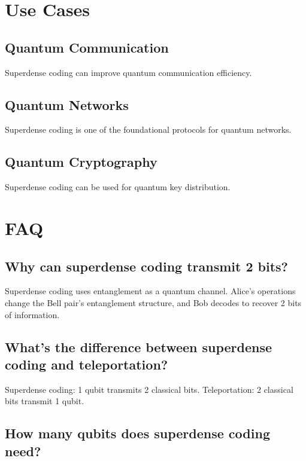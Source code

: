 \documentclass[12pt,a4paper]{article}
\begin{document}
\section{Use Cases}

\subsection{Quantum Communication}

Superdense coding can improve quantum communication efficiency.

\subsection{Quantum Networks}

Superdense coding is one of the foundational protocols for quantum networks.

\subsection{Quantum Cryptography}

Superdense coding can be used for quantum key distribution.

\section{FAQ}

\subsection{Why can superdense coding transmit 2 bits?}

Superdense coding uses entanglement as a quantum channel. Alice's operations change the Bell pair's entanglement structure, and Bob decodes to recover 2 bits of information.

\subsection{What's the difference between superdense coding and teleportation?}

Superdense coding: 1 qubit transmits 2 classical bits. Teleportation: 2 classical bits transmit 1 qubit.

\subsection{How many qubits does superdense coding need?}
\end{document}
